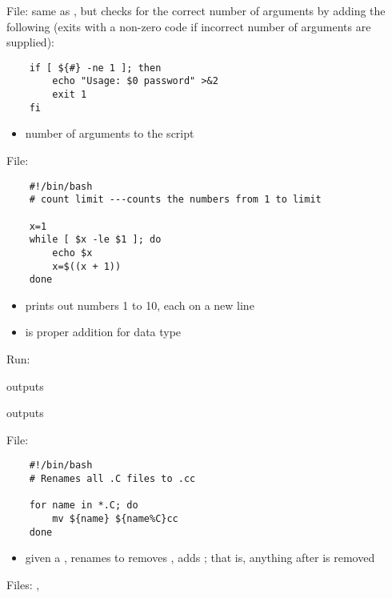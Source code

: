 File:  \textrightarrow{} same as ,
but checks for the correct number of arguments by adding the following
(exits with a non-zero code if incorrect number of arguments are supplied):

\begin{lstlisting}
    if [ ${#} -ne 1 ]; then
        echo "Usage: $0 password" >&2
        exit 1
    fi
\end{lstlisting}

\begin{itemize}
    \item \code{\$\{\#\}} \textrightarrow{} number of arguments to the script
\end{itemize}

File: 
\begin{lstlisting}
    #!/bin/bash
    # count limit ---counts the numbers from 1 to limit

    x=1
    while [ $x -le $1 ]; do
        echo $x
        x=$((x + 1))
    done
\end{lstlisting}
\begin{itemize}
    \item {} \textrightarrow{} prints out numbers 1 to 10,
          each on a new line
    \item {} is proper addition for  data type
\end{itemize}

Run: 

 \textrightarrow{} outputs 

 \textrightarrow{} outputs 

File: 

\begin{lstlisting}
    #!/bin/bash
    # Renames all .C files to .cc
    
    for name in *.C; do
        mv ${name} ${name%C}cc
    done
\end{lstlisting}
\begin{itemize}
    \item given a , 
          \textrightarrow{} renames 
          to  \textrightarrow{} removes , adds ; that is,
          anything after \code{\%} is removed
\end{itemize}

Files: , 

